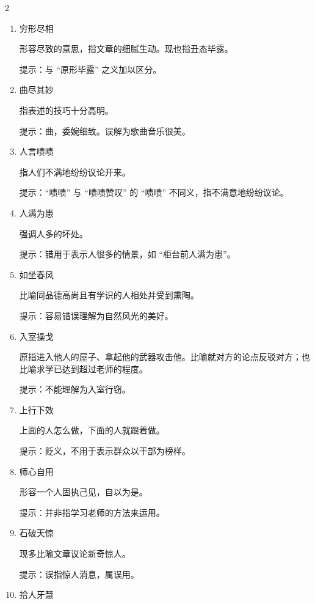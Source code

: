 \documentclass[final,oneside]{ctexbook}
\begin{document}
\begin{multicols}{2}
\begin{enumerate}
      提示：工，巧妙、精巧。

    \item 穷形尽相

      形容尽致的意思，指文章的细腻生动。现也指丑态毕露。

      提示：与 “原形毕露” 之义加以区分。

    \item 曲尽其妙

      指表述的技巧十分高明。

      提示：曲，委婉细致。误解为歌曲音乐很美。

    \item 人言啧啧

      指人们不满地纷纷议论开来。

      提示：“啧啧” 与 “啧啧赞叹” 的 “啧啧” 不同义，指不满意地纷纷议论。

    \item 人满为患

      强调人多的坏处。

      提示：错用于表示人很多的情景，如 “柜台前人满为患”。

    \item 如坐春风

      比喻同品德高尚且有学识的人相处并受到熏陶。

      提示：容易错误理解为自然风光的美好。

    \item 入室操戈

      原指进入他人的屋子、拿起他的武器攻击他。比喻就对方的论点反驳对方；也比喻求学已达到超过老师的程度。

      提示：不能理解为入室行窃。

    \item 上行下效

      上面的人怎么做，下面的人就跟着做。

      提示：贬义，不用于表示群众以干部为榜样。

    \item 师心自用

      形容一个人固执己见，自以为是。

      提示：并非指学习老师的方法来运用。

    \item 石破天惊

      现多比喻文章议论新奇惊人。

      提示：误指惊人消息，属误用。

    \item 拾人牙慧


\end{enumerate}
\end{multicols}
\end{document}
